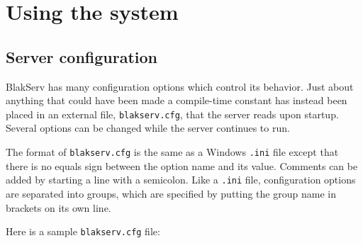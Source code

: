 \chapter{Using the system}

\section{Server configuration}

BlakServ has many configuration options which control its behavior.  
Just about anything that could have been made a compile-time constant
has instead been placed in an external file, \texttt{blakserv.cfg},
that the server reads upon startup.  Several options can be changed
while the server continues to run.  

The format of \texttt{blakserv.cfg} is the same as a Windows \texttt{.ini}
file except that there is no equals sign between the option name and
its value.  Comments can be added by starting a line with a semicolon.
Like a \texttt{.ini} file, configuration options are separated into groups,
which are specified by putting the group name in brackets on its own line.

Here is a sample \texttt{blakserv.cfg} file:

